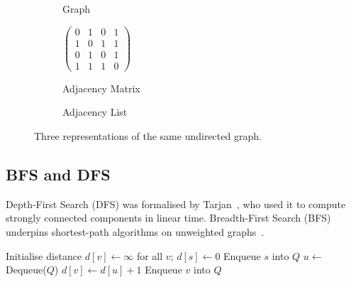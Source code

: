 \documentclass[12pt,a4paper]{article}
\begin{document}
\begin{figure}[h]
\centering
\begin{subfigure}[b]{0.30\textwidth}
\centering
{}
\caption{Graph}
\end{subfigure}
\hfill
\begin{subfigure}[b]{0.32\textwidth}
\centering
$\begin{pmatrix}
0 & 1 & 0 & 1 \\
1 & 0 & 1 & 1 \\
0 & 1 & 0 & 1 \\
1 & 1 & 1 & 0
\end{pmatrix}$
\caption{Adjacency Matrix}
\end{subfigure}
\hfill
\begin{subfigure}[b]{0.32\textwidth}
\centering
{}
\caption{Adjacency List}
\end{subfigure}
\caption{Three representations of the same undirected graph.}
\label{fig:graph-repr}
\end{figure}

\subsection{BFS and DFS}

Depth-First Search (DFS) was formalised by Tarjan~\cite{tarjan1972}, who used it
to compute strongly connected components in linear time.
Breadth-First Search (BFS) underpins shortest-path algorithms on unweighted graphs~\cite{cormen2022}.

\begin{algorithm}
\caption{Breadth-First Search (BFS)~\cite{cormen2022}}
\begin{algorithmic}[1]
  \State Initialise distance $d[v] \leftarrow \infty$ for all $v$; $d[s] \leftarrow 0$
  \State Enqueue $s$ into $Q$
    \State $u \leftarrow$ Dequeue($Q$)
        \State $d[v] \leftarrow d[u] + 1$
        \State Enqueue $v$ into $Q$
      \EndIf
    \EndFor
  \EndWhile
\EndProcedure
\end{algorithmic}
\end{algorithm}
\end{document}
